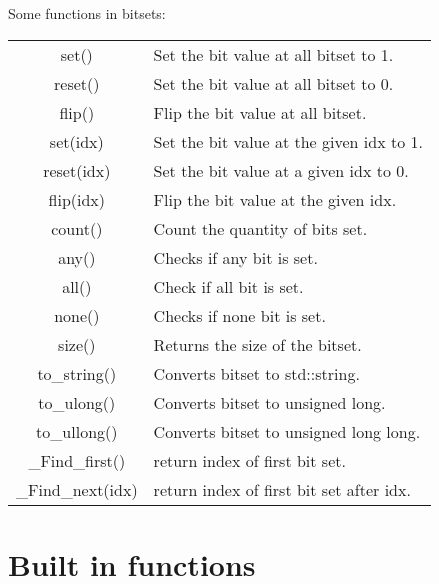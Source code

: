 Some functions in bitsets:
\begin{center}
\begin{tabular}{ c | l }
  set()  & Set the bit value at all bitset to 1.  \\ 
 reset() & Set the bit value at all bitset to 0.  \\  
 flip() & Flip the bit value at all bitset.\\
 set(idx) & Set the bit value at the given idx to 1.  \\ 
 reset(idx) & Set the bit value at a given idx to 0.  \\  
 flip(idx) & Flip the bit value at the given idx.\\
 count() & Count the quantity of bits set.\\  
 any() & Checks if any bit is set.\\
 all() & Check if all bit is set.\\
 none() & Checks if none bit is set.\\
 size() & Returns the size of the bitset.\\
 to\_string() & Converts bitset to std::string.\\
 to\_ulong() & Converts bitset to unsigned long.\\
 to\_ullong() & Converts bitset to unsigned long long.\\
 \_Find\_first() & return index of first bit set. \\
 \_Find\_next(idx) & return index of first bit set after idx.
\end{tabular}
\end{center}

\section{Built in functions}

